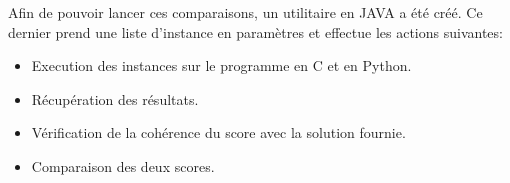 \documentclass[hideweeklyreports]{polytech/polytech}
\begin{document}
			Afin de pouvoir lancer ces comparaisons, un utilitaire en JAVA a été créé. Ce dernier prend une liste d'instance en paramètres et effectue les actions suivantes:
			\begin{itemize}
				\item Execution des instances sur le programme en C et en Python.
				\item Récupération des résultats.
				\item Vérification de la cohérence du score avec la solution fournie.
				\item Comparaison des deux scores.
			\end{itemize}
			
\end{document}
